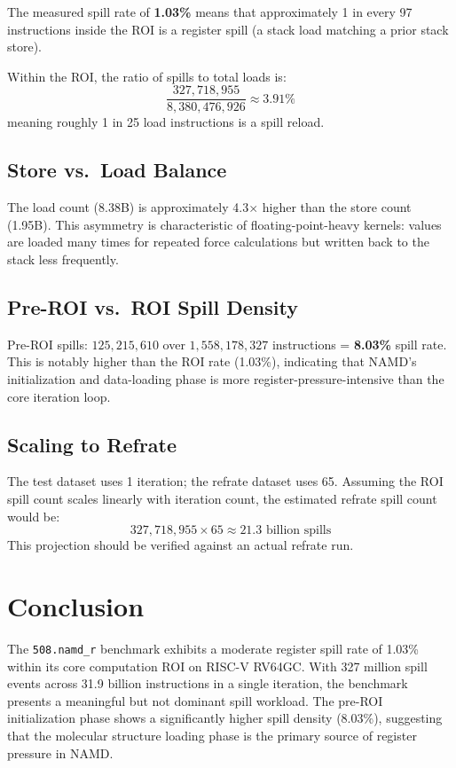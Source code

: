 \documentclass[conference]{IEEEtran}
\begin{document}
The measured spill rate of \textbf{1.03\%} means that approximately
1 in every 97 instructions inside the ROI is a register spill
(a stack load matching a prior stack store).

Within the ROI, the ratio of spills to total loads is:
\[
\frac{327{,}718{,}955}{8{,}380{,}476{,}926} \approx 3.91\%
\]
meaning roughly 1 in 25 load instructions is a spill reload.

\subsection{Store vs.\ Load Balance}

The load count (8.38B) is approximately 4.3$\times$ higher than the
store count (1.95B). This asymmetry is characteristic of
floating-point-heavy kernels: values are loaded many times for
repeated force calculations but written back to the stack
less frequently.

\subsection{Pre-ROI vs.\ ROI Spill Density}

Pre-ROI spills: $125{,}215{,}610$ over $1{,}558{,}178{,}327$ instructions
= \textbf{8.03\%} spill rate. This is notably higher than the ROI
rate (1.03\%), indicating that NAMD's initialization and data-loading
phase is more register-pressure-intensive than the core iteration loop.

\subsection{Scaling to Refrate}

The test dataset uses 1 iteration; the refrate dataset uses 65.
Assuming the ROI spill count scales linearly with iteration count,
the estimated refrate spill count would be:
\[
327{,}718{,}955 \times 65 \approx 21.3 \text{ billion spills}
\]
This projection should be verified against an actual refrate run.

\section{Conclusion}

The \texttt{508.namd\_r} benchmark exhibits a moderate register spill
rate of 1.03\% within its core computation ROI on RISC-V RV64GC.
With 327 million spill events across 31.9 billion instructions in a
single iteration, the benchmark presents a meaningful but not dominant
spill workload. The pre-ROI initialization phase shows a significantly
higher spill density (8.03\%), suggesting that the molecular structure
loading phase is the primary source of register pressure in NAMD.
\end{document}
